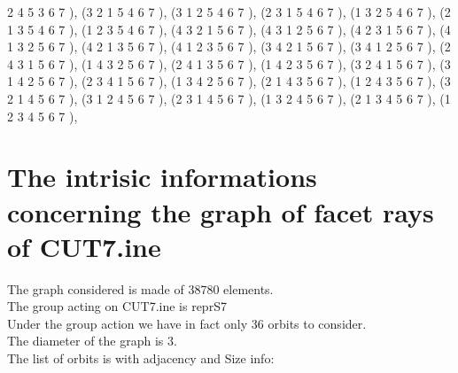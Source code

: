 \documentclass[12pt]{article}
\begin{document}
\begin{enumerate}
2 4 5 3 6 7  ), (3 2 1 5 4 6 7  ), (3 1 2 5 4 6 7  ), (2 3 1 5 4 6 7  ), (1 3 2 5 4 6 7  ), (2 1 3 5 4 6 7  ), (1 2 3 5 4 6 7  ), (4 3 2 1 5 6 7  ), (4 3 1 2 5 6 7  ), (4 2 3 1 5 6 7  ), (4 1 3 2 5 6 7  ), (4 2 1 3 5 6 7  ), (4 1 2 3 5 6 7  ), (3 4 2 1 5 6 7  ), (3 4 1 2 5 6 7  ), (2 4 3 1 5 6 7  ), (1 4 3 2 5 6 7  ), (2 4 1 3 5 6 7  ), (1 4 2 3 5 6 7  ), (3 2 4 1 5 6 7  ), (3 1 4 2 5 6 7  ), (2 3 4 1 5 6 7  ), (1 3 4 2 5 6 7  ), (2 1 4 3 5 6 7  ), (1 2 4 3 5 6 7  ), (3 2 1 4 5 6 7  ), (3 1 2 4 5 6 7  ), (2 3 1 4 5 6 7  ), (1 3 2 4 5 6 7  ), (2 1 3 4 5 6 7  ), (1 2 3 4 5 6 7  ), 
\end{enumerate}
\section{The intrisic informations concerning the graph of facet rays of CUT7.ine}
The graph considered is made of $38780$ elements.\\
The group acting on CUT7.ine is reprS7\\
Under the group action we have in fact only $36$ orbits to consider.\\
The diameter of the graph is $3$.\\
The list of orbits is with adjacency and Size info:
\end{document}
